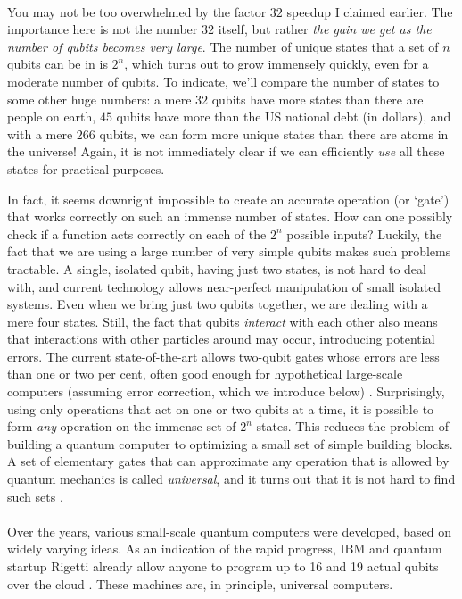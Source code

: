 \paragraph{}
You may not be too overwhelmed by the factor $32$ speedup I claimed earlier. The importance here is not the number $32$ itself, but rather \emph{the gain we get as the number of qubits becomes very large}. The number of unique states that a set of $n$ qubits can be in is $2^n$, which turns out to grow immensely quickly, even for a moderate number of qubits. To indicate, we'll compare the number of states to some other huge numbers: a mere $32$ qubits have more states than there are people on earth, $45$ qubits have more than the US national debt (in dollars), and with a mere $266$ qubits, we can form more unique states than there are atoms in the universe! Again, it is not immediately clear if we can efficiently \emph{use} all these states for practical purposes. 

In fact, it seems downright impossible to create an accurate operation (or `gate') that works correctly on such an immense number of states. How can one possibly check if a function acts correctly on each of the $2^n$ possible inputs? Luckily, the fact that we are using a large number of very simple qubits makes such problems tractable. A single, isolated qubit, having just two states, is not hard to deal with, and current technology allows near-perfect manipulation of small isolated systems. Even when we bring just two qubits together, we are dealing with a mere four states. Still, the fact that qubits \emph{interact} with each other also means that interactions with other particles around may occur, introducing potential errors. The current state-of-the-art allows two-qubit gates whose errors are less than one or two per cent, often good enough for hypothetical large-scale computers (assuming error correction, which we introduce below) \cite{Benhelm2008,Barends2014,Huang2019}. 
Surprisingly, using only operations that act on one or two qubits at a time, it is possible to form \emph{any} operation on the immense set of $2^n$ states. This reduces the problem of building a quantum computer to optimizing a small set of simple building blocks. A set of elementary gates that can approximate any operation that is allowed by quantum mechanics is called \emph{universal}, and it turns out that it is not hard to find such sets \cite{Deutsch1995}. 

\paragraph{}
Over the years, various small-scale quantum computers were developed, based on widely varying ideas. As an indication of the rapid progress, IBM and quantum startup Rigetti already allow anyone to program up to 16 and 19 actual qubits over the cloud \cite{IBMQ,Wootton2018,Dumitrescu2018}. These machines are, in principle, universal computers. 

